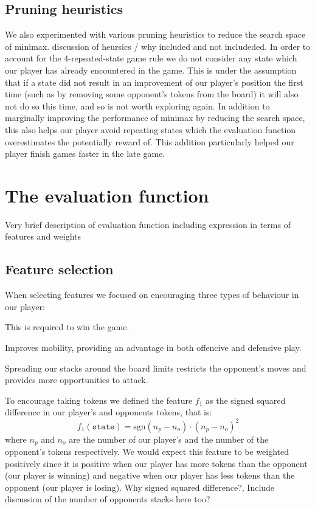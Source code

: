 \documentclass[11pt]{article}
\newcommand{\drafting}[1]{\textcolor{OliveGreen}{#1}}
\begin{document}
\subsection{Pruning heuristics}
We also experimented with various pruning heuristics to reduce the search space of minimax. \drafting{discussion of heursics / why included and not includeded}. In order to account for the 4-repeated-state game rule we do not consider any state which our player has already encountered in the game. This is under the assumption that if a state did not result in an improvement of our player's position the first time (such as by removing some opponent's tokens from the board) it will also not do so this time, and so is not worth exploring again. In addition to marginally improving the performance of minimax by reducing the search space, this also helps our player avoid repeating states which the evaluation function overestimates the potentially reward of. This addition particularly helped our player finish games faster in the late game. 



\section{The evaluation function}
\drafting{Very brief description of evaluation function including expression in terms of features and weights}
\subsection{Feature selection}
When selecting features we focused on encouraging three types of behaviour in our player: 
\begin{description}[labelindent=\parindent]
    \item[Taking tokens:] This is required to win the game.
    \item[Stacking:] Improves mobility, providing an advantage in both offencive and defensive play.
    \item[Controlling space:] Spreading our stacks around the board limits restricts the opponent's moves and provides more opportunities to attack.
\end{description}
To encourage taking tokens we defined the feature $f_1$ as the signed squared difference in our player's and opponents tokens, that is:
\[
    f_1(\texttt{state}) = \textrm{sgn} (n_p - n_o) \cdot (n_p - n_o) ^2
\]
where $n_p$ and $n_o$ are the number of our player's and the number of the opponent's tokens respectively. We would expect this feature to be weighted positively since it is positive when our player has more tokens than the opponent (our player is winning) and negative when our player has less tokens than the opponent (our player is losing). \drafting{Why signed squared difference?, Include discussion of the number of opponents stacks here too?}
\end{document}
